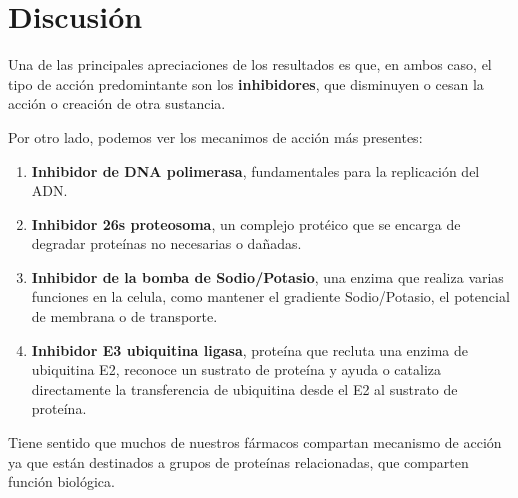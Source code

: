 \section{Discusión}

Una de las principales apreciaciones de los resultados es que, en ambos caso, el tipo de acción predomintante son los \textbf{inhibidores}, que disminuyen o cesan la acción o creación de otra sustancia.

Por otro lado, podemos ver los mecanimos de acción más presentes:
\begin{enumerate}
\item \textbf{Inhibidor de DNA polimerasa}, fundamentales para la replicación del ADN.
\item \textbf{Inhibidor 26s proteosoma}, un complejo protéico que se encarga de degradar proteínas no necesarias o dañadas.
\item \textbf{Inhibidor de la bomba de Sodio/Potasio}, una enzima que realiza varias funciones en la celula, como mantener el gradiente Sodio/Potasio, el potencial de membrana o de transporte. 
\item \textbf{Inhibidor E3 ubiquitina ligasa}, proteína que recluta una enzima de ubiquitina E2, reconoce un sustrato de proteína y ayuda o cataliza directamente la transferencia de ubiquitina desde el E2 al sustrato de proteína.
\end{enumerate}

Tiene sentido que muchos de nuestros fármacos compartan mecanismo de acción ya que están destinados a grupos de proteínas relacionadas, que comparten función biológica. 

\newpage
